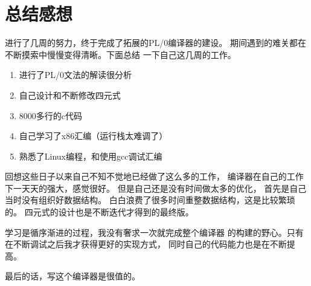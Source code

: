 \section{总结感想}

进行了几周的努力，终于完成了拓展的PL/0编译器的建设。
期间遇到的难关都在不断摸索中慢慢变得清晰。下面总结
一下自己这几周的工作。

\begin{enumerate}
	\item 进行了PL/0文法的解读很分析
	\item 自己设计和不断修改四元式
	\item 8000多行的c代码
	\item 自己学习了x86汇编（运行栈太难调了）
	\item 熟悉了Linux编程，和使用gcc调试汇编
\end{enumerate}

回想这些日子以来自己不知不觉地已经做了这么多的工作，
编译器在自己的工作下一天天的强大，感觉很好。
但是自己还是没有时间做太多的优化，
首先是自己当时没有组织好数据结构。
白白浪费了很多时间重整数据结构，这是比较繁琐的。
四元式的设计也是不断迭代才得到的最终版。

学习是循序渐进的过程，我没有奢求一次就完成整个编译器
的构建的野心。只有在不断调试之后我才获得更好的实现方式，
同时自己的代码能力也是在不断提高。

最后的话，写这个编译器是很值的。

